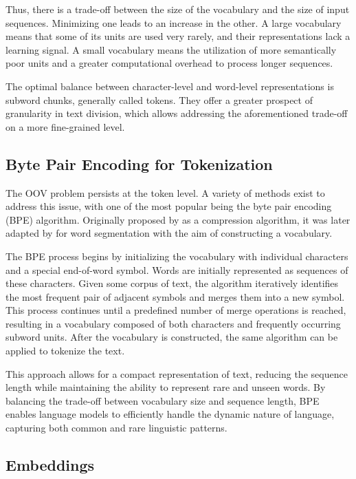 Thus, there is a trade-off between the size of the vocabulary and the size of input sequences. Minimizing one leads to an increase in the other. A large vocabulary means that some of its units are used very rarely, and their representations lack a learning signal. A small vocabulary means the utilization of more semantically poor units and a greater computational overhead to process longer sequences.

The optimal balance between character-level and word-level representations is subword chunks, generally called tokens. They offer a greater prospect of granularity in text division, which allows addressing the aforementioned trade-off on a more fine-grained level.

\subsection{Byte Pair Encoding for Tokenization}

The OOV problem persists at the token level. A variety of methods exist to address this issue, with one of the most popular being the byte pair encoding (BPE) algorithm. Originally proposed by \citet{gage1994} as a compression algorithm, it was later adapted by \citet{sennrich2016} for word segmentation with the aim of constructing a vocabulary.

The BPE process begins by initializing the vocabulary with individual characters and a special end-of-word symbol. Words are initially represented as sequences of these characters. Given some corpus of text, the algorithm iteratively identifies the most frequent pair of adjacent symbols and merges them into a new symbol. This process continues until a predefined number of merge operations is reached, resulting in a vocabulary composed of both characters and frequently occurring subword units. After the vocabulary is constructed, the same algorithm can be applied to tokenize the text.

This approach allows for a compact representation of text, reducing the sequence length while maintaining the ability to represent rare and unseen words. By balancing the trade-off between vocabulary size and sequence length, BPE enables language models to efficiently handle the dynamic nature of language, capturing both common and rare linguistic patterns.

\subsection{Embeddings}\label{sec:embeddings}

